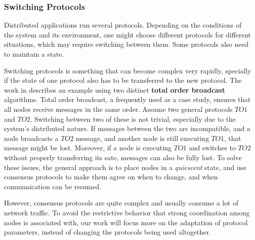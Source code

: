 \subsubsection{Switching Protocols}
\label{sssub:switchinprotocols}
\par Distributed applications run several protocols. Depending on the conditions of the system and its environment, one might choose different protocols for different situations, which may require switching between them. Some protocols also need to maintain a state.
\par Switching protocols is something that can become complex very rapidly, specially if the state of one protocol also has to be transferred to the new protocol. The work in \cite{Rosa2012} describes an example using two distinct \textbf{total order broadcast} algorithms. Total order broadcast,  a frequently used as a case study, ensures that all nodes receive messages in the same order. Assume two general protocols $TO1$ and $TO2$. Switching between two of these is not trivial, especially due to the system's distributed nature. If messages between the two are incompatible, and a node broadcasts a $TO2$ message, and another node is still executing $TO1$, that message might be lost. Moreover, if a node is executing $TO1$ and switches to $TO2$ without properly transferring its sate, messages can also be fully lost. To solve these issues, the general approach is to place nodes in a \textit{quiescent} state, and use consensus protocols to make them agree on when to change, and when communication can be resumed.%
\par However, consensus protocols are quite complex and usually consume a lot of network traffic. To avoid the restrictive behavior that strong coordination among nodes is associated with, our work will focus more on the adaptation of protocol parameters, instead of changing the protocols being used altogether. %
